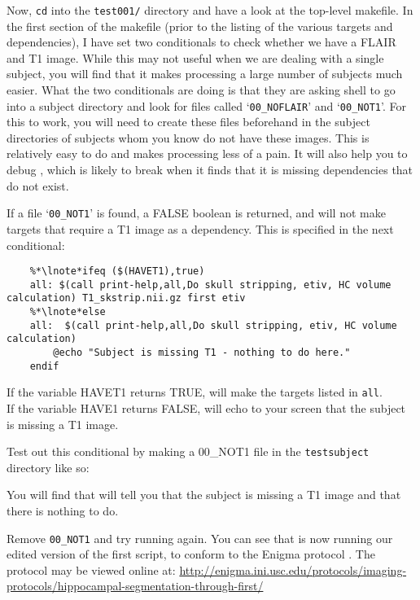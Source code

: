 Now, \texttt{cd} into the \texttt{test001/} directory and have a look at the top-level makefile. In the first section of the makefile (prior to the listing of the various targets and dependencies), I have set two conditionals to check whether we have a FLAIR and T1 image. While this may not useful when we are dealing with a single subject, you will find that it makes processing a large number of subjects much easier. What the two conditionals are doing is that they are asking shell to go into a subject directory and look for files called `\texttt{00_NOFLAIR}' and `\texttt{00_NOT1}'. For this to work, you will need to create these files beforehand in the subject directories of subjects whom you know do not have these images. This is relatively easy to do and makes processing less of a pain. It will also help you to debug \maken{}, which is likely to break when it finds that it is missing dependencies that do not exist.  
	
If a file `\texttt{00_NOT1}' is found, a FALSE boolean is returned, and \maken{} will not make targets that require a T1 image as a dependency. This is specified in the next conditional:
\begin{lstlisting}
	%*\lnote*ifeq ($(HAVET1),true)
	all: $(call print-help,all,Do skull stripping, etiv, HC volume calculation) T1_skstrip.nii.gz first etiv
	%*\lnote*else
	all:  $(call print-help,all,Do skull stripping, etiv, HC volume calculation)
		@echo "Subject is missing T1 - nothing to do here."
	endif
\end{lstlisting}

If the variable HAVET1 returns TRUE, \maken{} will make the targets listed in \texttt{all}.\\
\indent{}If the variable HAVE1 returns FALSE, \maken{} will echo to your screen that the subject is missing a T1 image.

Test out this conditional by making a 00_NOT1 file in the \texttt{testsubject} directory like so:

You will find that \maken{} will tell you that the subject is missing a T1 image and that there is nothing to do.

Remove \texttt{00_NOT1} and try running \maken{} again. You can see that \maken{} is now running our edited version of the first script, to conform to the Enigma protocol \citep[see][]{Stein2012}. 
The protocol may be viewed online at: \url{http://enigma.ini.usc.edu/protocols/imaging-protocols/hippocampal-segmentation-through-first/}

